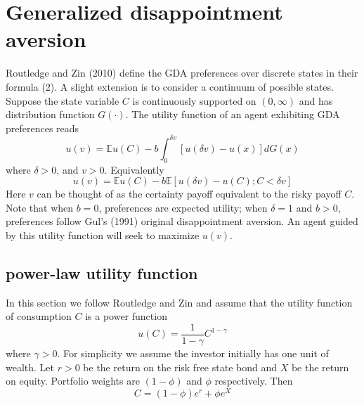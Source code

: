 \documentclass{article}
\newcommand{\E}{
  \mathbb{E}
}
\newcommand{\1}[1]{
  \mathbf{1}_{\{#1\}}
}
\begin{document}


\section{Generalized disappointment aversion}
\label{sec:GDA}
Routledge and Zin (2010) \cite{routledge2010generalized} define the GDA
preferences over discrete states in their formula (2). A slight extension
is to consider a continuum of possible states. Suppose the state variable
$C$ is continuously supported on $(0, \infty)$ and has distribution
function $G(\cdot)$. The utility function of an agent exhibiting GDA
preferences reads
\begin{equation}
  u(v)= \E u(C) - b \int_{0}^{\delta v}
  \left[ u(\delta v) - u(x) \right] dG(x)\label{11}%
\end{equation}
where $\delta > 0$, and $v>0$. Equivalently
\begin{equation}
  \label{eq:xxie0}
  u(v) = \E u(C) - b \E[u(\delta v) - u(C); C < \delta v]
\end{equation}
Here $v$ can be thought of as the certainty payoff equivalent to the
risky payoff $C$. Note that when $b=0$, 
preferences are expected utility; when $\delta=1$ and $b>0$,
preferences follow Gul's (1991) original disappointment aversion.
An agent guided by this utility function will seek to maximize $u(v)$.

\subsection{power-law utility function}
In this section we follow Routledge and Zin
\cite{routledge2010generalized} and assume 
that the utility function of consumption $C$ is a power function%
\begin{equation}
  \label{eq:power_utility}
  u(C)=\frac{1}{1-\gamma}C^{1-\gamma}%
\end{equation}
where $\gamma > 0$. For simplicity we assume the investor
initially has one unit of wealth. Let $r > 0$ be the return on the
risk free state bond and $X$ be the return on equity. Portfolio weights
are $\left(1-\phi\right)$ and $\phi$ respectively. Then
\begin{equation}
  \label{eq:xxie1}
  C = (1 - \phi) e^r + \phi e^X
\end{equation}
\end{document}
